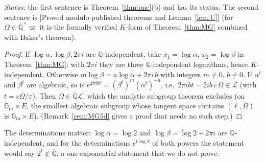 \documentclass[11pt]{amsart}
\theoremstyle{definition}
\newcommand{\Qb}{\overline{\mathbb{Q}}}
\newcommand{\Q}{\mathbb{Q}}
\newcommand{\Gm}{\mathbb{G}_{\mathrm m}}
\newcommand{\Lg}{\mathcal{L}}
\newcommand{\vp}{\varpi}
\newcommand{\lab}[1]{\textup{[#1]}}
\newcommand{\LabC}{\lab{Proved modulo published theorems and Lemma~\ref{lem:U}}}
\newcommand{\Status}{\noindent\emph{Status:} }
\begin{document}
\Status the first sentence is Theorem~\ref{thm:one}(b) and has its status. The second sentence is \LabC{} (for
$\Omega\in\Qb^\times\vp$ it is the formally verified $K$-form of Theorem~\ref{thm:MG} combined with Baker's theorem).

\begin{proof}
If $\log\alpha,\log\beta,2\pi i$ are $\Q$-independent, take $x_1=\log\alpha$, $x_2=\log\beta$ in Theorem~\ref{thm:MG}:
with $2\pi i$ they are three $\Q$-independent logarithms, hence $K$-independent. Otherwise
$m\log\beta=a\log\alpha+2\pi i\,b$ with integers $m\ne0$, $b\ne0$. If $\alpha^t$ and $\beta^t$ are algebraic, so is
$e^{2\pi ibt}=(\beta^t)^m(\alpha^t)^{-a}$, i.e.\ $2\pi ibt=2ib\,c\,\Omega\in\Lg$ (with $t=c\Omega/\pi$). Then
$\Omega\in\Qb\Lg$, which the analytic subgroup theorem \cite{Wu89} excludes (on $\Gm\times E$, the smallest algebraic
subgroup whose tangent space contains $(\ell,\Omega)$ is $\Gm\times E$). (Remark~\ref{rem:MG5d} gives a proof that needs
no such step.)
\end{proof}

\noindent The determinations matter: $\log\alpha=\log2$ and $\log\beta=\log2+2\pi i$ are $\Q$-independent, and for the
determinations $e^{t\log2}$ of both powers the statement would say $2^t\notin\Qb$, a one-exponential statement that we do
not prove.
\end{document}
